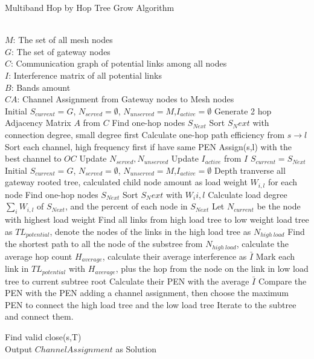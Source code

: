




\begin{algorithm}
    \small
\caption{Multiband Hop by Hop Tree Grow Algorithm}
\label{algorithms:hoho}
\begin{algorithmic}[1]
\REQUIRE  ~~\\
	 $M$: The set of all mesh nodes\\
	 $G$: The set of gateway nodes\\
	 $C$: Communication graph of potential links among all nodes\\
	 $I$: Interference matrix of all potential links \\
	 $B$: Bands amount
\ENSURE ~~\\    
$CA$: Channel Assignment from Gateway nodes to Mesh nodes\\
\STATE Initial $S_{current}=G$, $N_{served}=\emptyset$, $N_{unserved}=M$,$I_{active}=\emptyset$
\STATE Generate 2 hop Adjacency Matrix $A$ from $C$
	\STATE Find one-hop nodes $S_{Next}$
	\STATE Sort $S_Next$ with connection degree, small degree first
		\STATE Calculate one-hop path efficiency from $s\rightarrow l$
		\STATE Sort each channel, high frequency first if have same PEN
		\STATE Assign(s,l) with the best channel to $OC$
		\STATE Update $N_{served},N_{unserved}$
		\STATE Update $I_{active}$ from $I$
	\ENDFOR
	\STATE $S_{current}=S_{Next}$
\ENDFOR
\STATE Initial $S_{current}=G$, $N_{served}=\emptyset$, $N_{unserved}=M$,$I_{active}=\emptyset$
\STATE Depth tranverse all gateway rooted tree, calculated child node amount as load weight $W_{i,l}$ for each node
	\STATE Find one-hop nodes $S_{Next}$
	\STATE Sort $S_Next$ with $W_i{i,l}$
	\STATE Calculate load degree $\sum_{i}W_{i,l}$ of $S_{Next}$, and the percent of each node in $S_{Next}$ 
	\STATE Let $N_{current}$ be the node with highest load weight
	\STATE Find all links from high load tree to low weight load tree as $TL_{potential}$, denote the nodes of the links in the high load tree as $N_{high\ load}$
	\STATE Find the shortest path to all the node of the substree from $N_{high\ load}$, calculate the average hop count $H_{average}$, calculate their average interference as $\bar{I}$
	\STATE Mark each link in $TL_{potential}$ with $H_{average}$, plus the hop from the node on the link in low load tree to current subtree root
	\STATE Calculate their PEN with the average $\bar{I}$
	\STATE Compare the PEN with the PEN adding a channel assignment, then choose the maximum PEN to connect the high load tree and the low load tree
	\STATE Iterate to the subtree and connect them.
\ENDFOR


\STATE  Find valid close(s,T) \\
Output $Channel Assignment$ as Solution
\end{algorithmic}
\end{algorithm}
      

